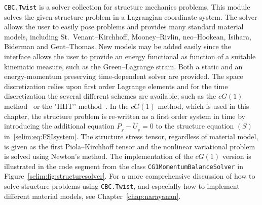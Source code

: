 \texttt{CBC.Twist} is a solver collection for structure mechanics
problems. This module solves the given structure problem in a
Lagrangian coordinate system.  The solver allows the user to easily
pose problems and provides many standard material models, including
St.~Venant--Kirchhoff, Mooney--Rivlin, neo--Hookean, Isihara, Biderman
and Gent--Thomas. New models may be added easily since the interface
allows the user to provide an energy functional as function of a
suitable kinematic measure, such as the Green--Lagrange strain. Both a
static and an energy-momentum preserving time-dependent solver are
provided. The space discretization relies upon first order Lagrange
elements and for the time discretization the several different schemes
are available, such as the $cG(1)$ method~\cite{ErikssonEstepEtAl1996,
  ErikssonEstepEtAl2003} or the "HHT''
method~\cite{HilberHughesTaylor1977}.  In the $cG(1)$ method, which is
used in this chapter, the structure problem is re-written as a first
order system in time by introducing the additional equation $P_{_{S}}
- \dot{U}_{_{S}} = 0$ to the structure equation $(S)$
in~\eqref{selim:eq:FSIsystem}. The structure stress tensor, regardless
of material model, is given as the first Piola--Kirchhoff tensor and
the nonlinear variational problem is solved using Newton's method.
The implementation of the $cG(1)$ version is illustrated in the code
segment from the class \texttt{CG1MomentumBalanceSolver} in
Figure~\ref{selim:fig:structuresolver}. For a more comprehensive
discussion of how to solve structure problems using
\texttt{CBC.Twist}, and especially how to implement different material
models, see Chapter~\ref{chap:narayanan}.

